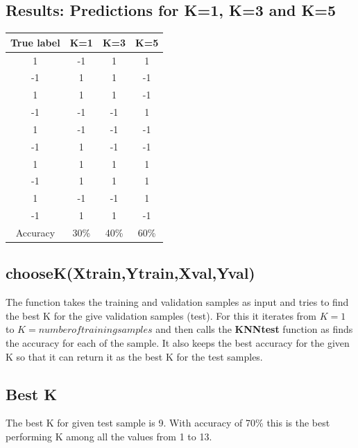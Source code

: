 \documentclass[12pt]{report}
\begin{document}
{\subsection{Results: Predictions for K=1, K=3 and K=5}
\begin{table}[h]
\centering
\begin{tabular}{|c|c|c|c|}
\hline
\textbf{True label} & \textbf{K=1} & \textbf{K=3} & \textbf{K=5} \\ \hline
1          & -1           & 1            & 1            \\ \hline
-1         & 1            & 1            & -1           \\ \hline
1          & 1            & 1            & -1           \\ \hline
-1         & -1           & -1           & 1            \\ \hline
1          & -1           & -1           & -1           \\ \hline
-1         & 1            & -1           & -1           \\ \hline
1          & 1            & 1            & 1            \\ \hline
-1         & 1            & 1            & 1            \\ \hline
1          & -1           & -1           & 1            \\ \hline
-1         & 1            & 1            & -1           \\ \hline
Accuracy   & 30\%         & 40\%         & 60\%         \\ \hline
\end{tabular}
\end{table}


\subsection{choose\textunderscore K(X\textunderscore train,Y\textunderscore train,X\textunderscore val,Y\textunderscore val)}
The function takes the training and validation samples as input and tries to find the best K for the give validation samples (test). For this it iterates from $K=1$ to $K=number of training samples$ and then calls the \textbf{KNN\textunderscore test} function as finds the accuracy for each of the sample. It also keeps the best accuracy for the given K so that it can return it as the best K for the test samples. 

\subsection{Best K}
The best K for given test sample is 9. With accuracy of 70\% this is the best performing K among all the values from 1 to 13.


}
\end{document}
